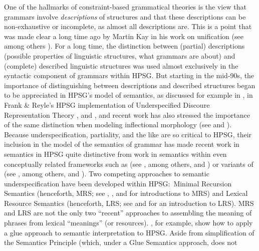 \documentclass[output=paper
	        ,collection
	        ,collectionchapter
 	        ,biblatex
                ,babelshorthands
                ,newtxmath
                ,draftmode
                ,colorlinks, citecolor=brown
]{langscibook}
\begin{document}
One of the hallmarks of constraint-based grammatical theories is the view that grammars involve \emph{descriptions} of structures and that these descriptions can be non-exhaustive or incomplete, as almost all descriptions are.
This is a point that was made clear a long time ago by Martin Kay in his work on unification (see among others \citealt{Kay1979}). For a long time, the distinction between (partial) descriptions (possible properties of linguistic structures, what grammars are about) and (complete) described linguistic structures was used almost exclusively in the syntactic component of grammars within HPSG. But starting in the mid-90s, the importance of distinguishing between descriptions and described structures began to be appreciated in HPSG's model of semantics, as discussed for example in \citet{Nerbonne1993a}, in Frank \& Reyle's HPSG implementation of Underspecified Discoure Representation Theory \citep{FrankandReyle1992,FrankandReyle1995}, and \citet*{Copestakeetal1995}, and recent work has also stressed the importance of the same distinction when modeling inflectional morphology (see \citealt{CrysmannandBonami2016} and ). Because underspecification, partiality, and the like are so critical to HPSG, their inclusion in the model of the semantics of grammar has made recent work in semantics in HPSG quite distinctive from work in semantics within even conceptually related frameworks such as  (see \citealt{BresnanandKaplan1982b}, among others, and ) or variants of  (see \citealt{Steedman1996}, among others, and ). Two competing approaches to semantic underspecification have been developed within HPSG:\ Minimal Recursion Semantics (henceforth, MRS; see \citealt{Copestakeetal1995}, \citealt{Copestakeetal2001}, and \citealt{Copestakeetal2005} for introductions to MRS) and Lexical Resource Semantics (henceforth, LRS; see \citealt{RichterandSailer2004,RichterandSailer2001} and \citealt{IordachioaiaandRichter2015} for an introduction to LRS). MRS and LRS are not the only two ``recent'' approaches  to assembling the meaning of phrases from lexical ``meanings'' (or resources). \citet{AsudehandCrouch2002}, for example, show how to apply a glue approach to semantic interpretation to HPSG. Aside from simplification of the Semantics Principle (which, under a Glue Semantics approach, does not
\end{document}
